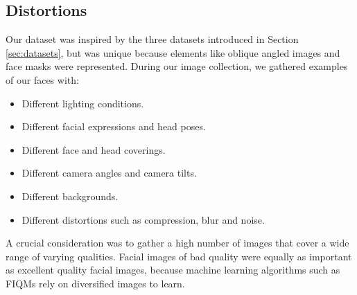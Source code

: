 \subsection{Distortions}
Our dataset was inspired by the three datasets introduced in Section \ref{sec:datasets}, but was unique because elements like oblique angled images and face masks were represented. During our image collection, we gathered examples of our faces with: 
%
\begin{itemize}
    \item Different lighting conditions.
    \item Different facial expressions and head poses.
    \item Different face and head coverings. 
    \item Different camera angles and camera tilts.
    \item Different backgrounds.
    \item Different distortions such as compression, blur and noise.
\end{itemize}

A crucial consideration was to gather a high number of images that cover a wide range of varying qualities. Facial images of bad quality were equally as important as excellent quality facial images, because machine learning algorithms such as FIQMs rely on diversified images to learn.  

